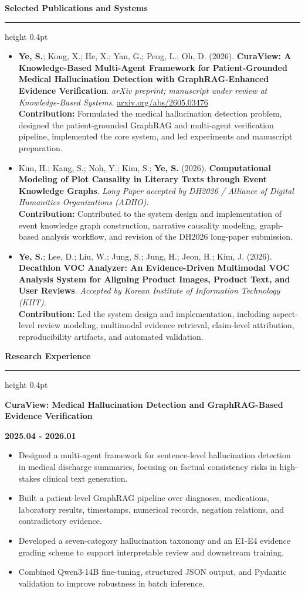 \documentclass[10pt,a4paper]{article}
\newcommand{\cvsection}[1]{%
  \vspace{10pt}%
  {\Large\bfseries #1}\par%
  \vspace{1pt}%
  \hrule height 0.4pt%
  \vspace{3pt}%
}
\newcommand{\entrytitle}[1]{\textbf{#1}\par}
\newcommand{\entrydate}[1]{\textbf{#1}\par}
\begin{document}
\cvsection{Selected Publications and Systems}
\begin{itemize}
  \item \textbf{Ye, S.}; Kong, X.; He, X.; Yan, G.; Peng, L.; Oh, D. (2026). \textbf{CuraView: A Knowledge-Based Multi-Agent Framework for Patient-Grounded Medical Hallucination Detection with GraphRAG-Enhanced Evidence Verification}. \textit{arXiv preprint; manuscript under review at Knowledge-Based Systems}. \href{https://arxiv.org/abs/2605.03476}{arxiv.org/abs/2605.03476}\\
  \textbf{Contribution:} Formulated the medical hallucination detection problem, designed the patient-grounded GraphRAG and multi-agent verification pipeline, implemented the core system, and led experiments and manuscript preparation.

  \item Kim, H.; Kang, S.; Noh, Y.; Kim, S.; \textbf{Ye, S.} (2026). \textbf{Computational Modeling of Plot Causality in Literary Texts through Event Knowledge Graphs}. \textit{Long Paper accepted by DH2026 / Alliance of Digital Humanities Organizations (ADHO)}.\\
  \textbf{Contribution:} Contributed to the system design and implementation of event knowledge graph construction, narrative causality modeling, graph-based analysis workflow, and revision of the DH2026 long-paper submission.

  \item \textbf{Ye, S.}; Lee, D.; Liu, W.; Jung, S.; Jung, H.; Jeon, H.; Kim, J. (2026). \textbf{Decathlon VOC Analyzer: An Evidence-Driven Multimodal VOC Analysis System for Aligning Product Images, Product Text, and User Reviews}. \textit{Accepted by Korean Institute of Information Technology (KIIT)}.\\
  \textbf{Contribution:} Led the system design and implementation, including aspect-level review modeling, multimodal evidence retrieval, claim-level attribution, reproducibility artifacts, and automated validation.
\end{itemize}

\cvsection{Research Experience}
\newpage

\entrytitle{CuraView: Medical Hallucination Detection and GraphRAG-Based Evidence Verification}
\entrydate{2025.04 - 2026.01}
\begin{itemize}
  \item Designed a multi-agent framework for sentence-level hallucination detection in medical discharge summaries, focusing on factual consistency risks in high-stakes clinical text generation.
  \item Built a patient-level GraphRAG pipeline over diagnoses, medications, laboratory results, timestamps, numerical records, negation relations, and contradictory evidence.
  \item Developed a seven-category hallucination taxonomy and an E1-E4 evidence grading scheme to support interpretable review and downstream training.
  \item Combined Qwen3-14B fine-tuning, structured JSON output, and Pydantic validation to improve robustness in batch inference.
\end{itemize}
\end{document}
